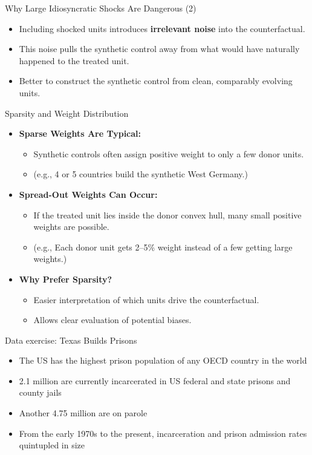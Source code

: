\documentclass{beamer}
\begin{document}
\begin{frame}{Why Large Idiosyncratic Shocks Are Dangerous (2)}
  \begin{itemize}
    \item Including shocked units introduces \textbf{irrelevant noise} into the counterfactual.
    \item This noise pulls the synthetic control away from what would have naturally happened to the treated unit.
    \item Better to construct the synthetic control from clean, comparably evolving units.
  \end{itemize}
\end{frame}


\begin{frame}{Sparsity and Weight Distribution}
  \begin{itemize}
    \item \textbf{Sparse Weights Are Typical:}
    \begin{itemize}
      \item Synthetic controls often assign positive weight to only a few donor units.
      \item (e.g., 4 or 5 countries build the synthetic West Germany.)
    \end{itemize}
    \item \textbf{Spread-Out Weights Can Occur:}
    \begin{itemize}
      \item If the treated unit lies inside the donor convex hull, many small positive weights are possible.
      \item (e.g., Each donor unit gets 2–5\% weight instead of a few getting large weights.)
    \end{itemize}
    \item \textbf{Why Prefer Sparsity?}
    \begin{itemize}
      \item Easier interpretation of which units drive the counterfactual.
      \item Allows clear evaluation of potential biases.
    \end{itemize}
  \end{itemize}
\end{frame}


\begin{frame}{Data exercise: Texas Builds Prisons}
	
	\begin{itemize}
	\item The US has the highest prison population of any OECD country in the world 
	\item 2.1 million are currently incarcerated in US federal and state prisons and county jails
	\item Another 4.75 million are on parole
	\item From the early 1970s to the present, incarceration and prison admission rates quintupled in size
	\end{itemize}
\end{frame}
\end{document}
